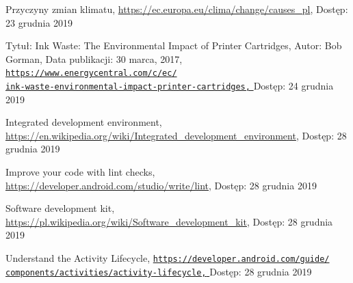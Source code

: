 \documentclass[a4paper,12pt, twoside]{article}
\begin{document}
     	\begingroup
    	\renewcommand{\section}[2]{}
    	\begin{thebibliography}{}
    		
    		Przyczyny zmian klimatu,
    		\newline\url{https://ec.europa.eu/clima/change/causes\_pl}, 
    		\newline Dostęp: 23 grudnia 2019
    		
    		Tytuł: Ink Waste: The Environmental Impact of Printer Cartridges,\newline
    		Autor: Bob Gorman,\newline
    		Data publikacji: 30 marca, 2017,
    		\newline\href{https://www.energycentral.com/c/ec/ink-waste-environmental-impact-printer-cartridges}
    		 {\nolinkurl{https://www.energycentral.com/c/ec/}
                 \\
                  \nolinkurl{ink-waste-environmental-impact-printer-cartridges,}
                 }
    		\newline Dostęp: 24 grudnia 2019
    		
    		Integrated development environment,
    		\newline\url{https://en.wikipedia.org/wiki/Integrated_development_environment}, 
    		\newline Dostęp: 28 grudnia 2019
    		
    		Improve your code with lint checks,
    		\newline\url{https://developer.android.com/studio/write/lint}, 
    		\newline Dostęp: 28 grudnia 2019
    		
    		Software development kit,
    		\newline\url{https://pl.wikipedia.org/wiki/Software_development_kit}, 
    		\newline Dostęp: 28 grudnia 2019
    		
    		Understand the Activity Lifecycle,
    		\newline\href{https://developer.android.com/guide/components/activities/activity-lifecycle}
    		 {\nolinkurl{https://developer.android.com/guide/}
                 \\
                  \nolinkurl{components/activities/activity-lifecycle,}
                 }
    		\newline Dostęp: 28 grudnia 2019
    

\end{thebibliography}
\end{document}
